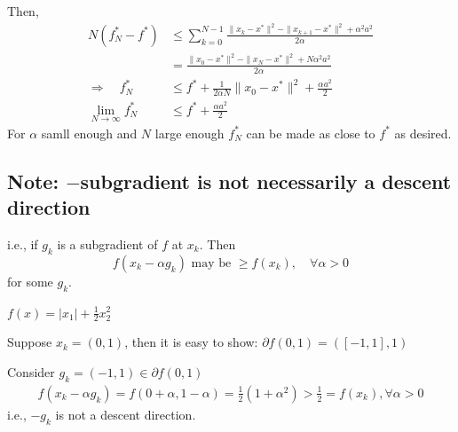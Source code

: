 \documentclass[11pt]{elegantbook}
\begin{document}
Then,
\begin{equation}
    \begin{aligned}
        N(f_N^*-f^*)&\leq \sum_{k=0}^{N-1}\frac{\|x_k-x^*\|^2-\|x_{k+1}-x^*\|^2+\alpha^2a^2}{2\alpha}\\
        &=\frac{\|x_0-x^*\|^2-\|x_{N}-x^*\|^2+N\alpha^2a^2}{2\alpha}\\
        \Rightarrow\quad f_N^*&\leq f^*+\frac{1}{2\alpha N}\|x_0-x^*\|^2+\frac{\alpha a^2}{2}\\
        \lim_{N \rightarrow	\infty} f_N^*&\leq f^*+\frac{\alpha a^2}{2}
    \end{aligned}
    \nonumber
\end{equation}
For $\alpha$ samll enough and $N$ large enough $f^*_N$ can be made as close to $f^*$ as desired.

\subsection*{Note: $-$subgradient is not necessarily a descent direction}
i.e., if $g_k$ is a subgradient of $f$ at $x_k$. Then $$f(x_k-\alpha g_k)\text{ may be }\geq f(x_k),\quad \forall \alpha>0$$
for some $g_k$.

\begin{example}
    $f(x)=|x_1|+\frac{1}{2}x_2^2$
\end{example}
Suppose $x_k=(0,1)$, then it is easy to show: $\partial f(0,1)=([-1,1],1)$

Consider $g_k=(-1,1)\in\partial f(0,1)$
\begin{equation}
    \begin{aligned}
        f(x_k-\alpha g_k)=f(0+\alpha,1-\alpha)=\frac{1}{2}(1+\alpha^2)>\frac{1}{2}=f(x_k),\forall \alpha>0
    \end{aligned}
    \nonumber
\end{equation}
i.e., $-g_k$ is not a descent direction.

\begin{center}
\end{center}
\end{document}
